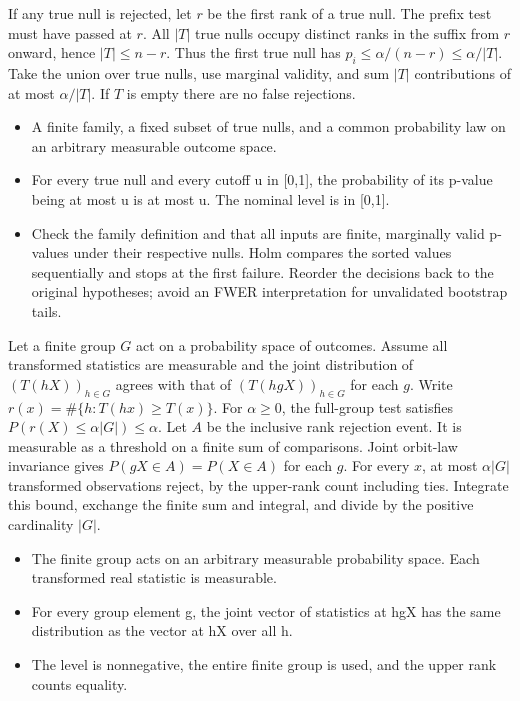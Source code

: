\expandafter\def\csname statadic@proof@STATADIC-MULTIPLICITY-002\endcsname{If any true null is rejected, let $r$ be the first rank of
  a true null. The prefix test must have passed at $r$. All $|T|$ true
  nulls occupy distinct ranks in the suffix from $r$ onward, hence
  $|T|\le n-r$. Thus the first true null has $p_i\le\alpha/(n-r)
  \le\alpha/|T|$. Take the union over true nulls, use marginal validity,
  and sum $|T|$ contributions of at most $\alpha/|T|$. If $T$ is empty
  there are no false rejections.}
\expandafter\def\csname statadic@assumptions@STATADIC-MULTIPLICITY-002\endcsname{\begin{itemize}
\item A finite family, a fixed subset of true nulls, and a common probability law on an arbitrary measurable outcome space.
\item For every true null and every cutoff u in [0,1], the probability of its p-value being at most u is at most u. The nominal level is in [0,1].
\end{itemize}}
\expandafter\def\csname statadic@diagnostics@STATADIC-MULTIPLICITY-002\endcsname{\begin{itemize}
\item Check the family definition and that all inputs are finite, marginally valid p-values under their respective nulls. Holm compares the sorted values sequentially and stops at the first failure. Reorder the decisions back to the original hypotheses; avoid an FWER interpretation for unvalidated bootstrap tails.
\end{itemize}}
\expandafter\def\csname statadic@statement@STATADIC-RANDOMIZATION-003\endcsname{Let a finite group $G$ act on a probability space of
  outcomes. Assume all transformed statistics are measurable and the joint
  distribution of $(T(hX))_{h\in G}$ agrees with that of $(T(hgX))_{h\in G}$
  for each $g$. Write $r(x)=\#\{h:T(hx)\ge T(x)\}$. For $\alpha\ge0$,
  the full-group test satisfies $P(r(X)\le\alpha |G|)\le\alpha$.}
\expandafter\def\csname statadic@proof@STATADIC-RANDOMIZATION-003\endcsname{Let $A$ be the inclusive rank rejection event. It is
  measurable as a threshold on a finite sum of comparisons. Joint orbit-law
  invariance gives $P(gX\in A)=P(X\in A)$ for each $g$. For every $x$,
  at most $\alpha |G|$ transformed observations reject, by the upper-rank
  count including ties. Integrate this bound, exchange the finite sum and
  integral, and divide by the positive cardinality $|G|$.}
\expandafter\def\csname statadic@assumptions@STATADIC-RANDOMIZATION-003\endcsname{\begin{itemize}
\item The finite group acts on an arbitrary measurable probability space. Each transformed real statistic is measurable.
\item For every group element g, the joint vector of statistics at hgX has the same distribution as the vector at hX over all h.
\item The level is nonnegative, the entire finite group is used, and the upper rank counts equality.
\end{itemize}}
